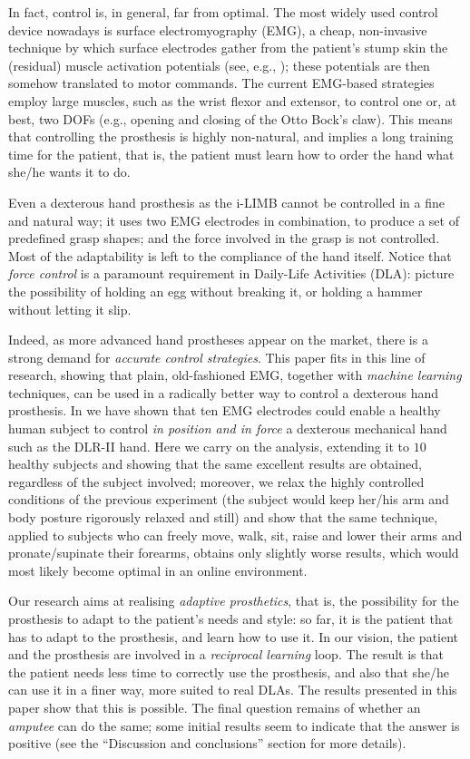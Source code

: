 In fact, control is, in general, far from optimal. The most widely
used control device nowadays is surface electromyography (EMG), a
cheap, non-invasive technique by which surface electrodes gather from
the patient's stump skin the (residual) muscle activation potentials
(see, e.g., \cite{deluca}); these potentials are then somehow
translated to motor commands. The current EMG-based strategies employ
large muscles, such as the wrist flexor and extensor, to control one
or, at best, two DOFs (e.g., opening and closing of the Otto Bock's
claw). This means that controlling the prosthesis is highly
non-natural, and implies a long training time for the patient, that
is, the patient must learn how to order the hand what she/he wants it
to do.

Even a dexterous hand prosthesis as the i-LIMB cannot be controlled in
a fine and natural way; it uses two EMG electrodes in combination, to
produce a set of predefined grasp shapes; and the force involved in
the grasp is not controlled. Most of the adaptability is left to the
compliance of the hand itself. Notice that \emph{force control} is a
paramount requirement in Daily-Life Activities (DLA): picture the
possibility of holding an egg without breaking it, or holding a hammer
without letting it slip.

Indeed, as more advanced hand prostheses appear on the market, there
is a strong demand for \emph{accurate control strategies}. This paper
fits in this line of research, showing that plain, old-fashioned EMG,
together with \emph{machine learning} techniques, can be used in a
radically better way to control a dexterous hand prosthesis. In
\cite{2008.ICRA,2008.BioCyb} we have shown that ten EMG electrodes
could enable a healthy human subject to control \emph{in position and
in force} a dexterous mechanical hand such as the DLR-II hand. Here we
carry on the analysis, extending it to $10$ healthy subjects and
showing that the same excellent results are obtained, regardless of
the subject involved; moreover, we relax the highly controlled
conditions of the previous experiment (the subject would keep her/his
arm and body posture rigorously relaxed and still) and show that the
same technique, applied to subjects who can freely move, walk, sit,
raise and lower their arms and pronate/supinate their forearms,
obtains only slightly worse results, which would most likely become
optimal in an online environment.

Our research aims at realising \emph{adaptive prosthetics}, that is,
the possibility for the prosthesis to adapt to the patient's needs and
style: so far, it is the patient that has to adapt to the prosthesis,
and learn how to use it. In our vision, the patient and the prosthesis
are involved in a \emph{reciprocal learning} loop. The result is that
the patient needs less time to correctly use the prosthesis, and also
that she/he can use it in a finer way, more suited to real DLAs. The
results presented in this paper show that this is possible. The final
question remains of whether an
\emph{amputee} can do the same; some initial results seem to indicate
that the answer is positive (see the ``Discussion and conclusions''
section for more details).

